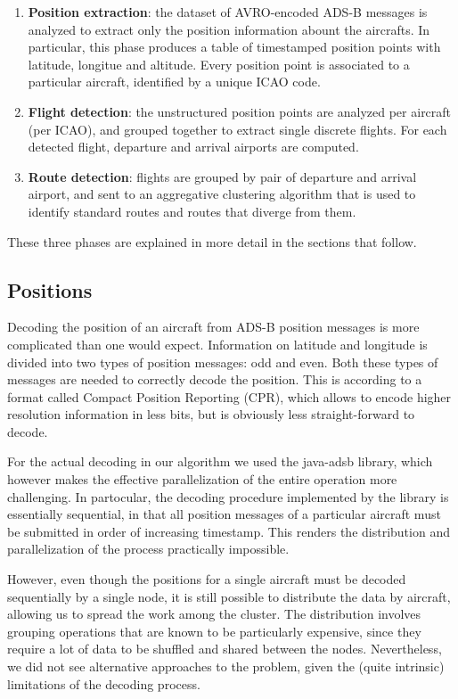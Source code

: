 \documentclass{vldb}
\begin{document}
\begin{enumerate}
  \item \textbf{Position extraction}: the dataset of AVRO-encoded ADS-B messages
  is analyzed to extract only the position information abount the aircrafts. In
  particular, this phase produces a table of timestamped position points with
  latitude, longitue and altitude. Every position point is associated to a
  particular aircraft, identified by a unique ICAO code.
  \item \textbf{Flight detection}: the unstructured position points are analyzed
  per aircraft (per ICAO), and grouped together to extract single discrete
  flights. For each detected flight, departure and arrival airports are
  computed.
  \item \textbf{Route detection}: flights are grouped by pair of departure and
  arrival airport, and sent to an aggregative clustering algorithm that is used
  to identify standard routes and routes that diverge from them.
\end{enumerate}

These three phases are explained in more detail in the sections that follow.

\subsection{Positions}

Decoding the position of an aircraft from ADS-B position messages is more
complicated than one would expect. Information on latitude and longitude is
divided into two types of position messages: odd and even. Both these types of
messages are needed to correctly decode the position. This is according to a
format called Compact Position Reporting (CPR), which allows to encode higher
resolution information in less bits, but is obviously less straight-forward to
decode.

For the actual decoding in our algorithm we used the java-adsb library, which
however makes the effective parallelization of the entire operation more
challenging. In partocular, the decoding procedure implemented by the library is
essentially sequential, in that all position messages of a particular aircraft
must be submitted in order of increasing timestamp. This renders the
distribution and parallelization of the process practically impossible.

However, even though the positions for a single aircraft must be decoded
sequentially by a single node, it is still possible to distribute the data by
aircraft, allowing us to spread the work among the cluster. The distribution
involves grouping operations that are known to be particularly expensive, since
they require a lot of data to be shuffled and shared between the nodes.
Nevertheless, we did not see alternative approaches to the problem, given the
(quite intrinsic) limitations of the decoding process.
\end{document}
